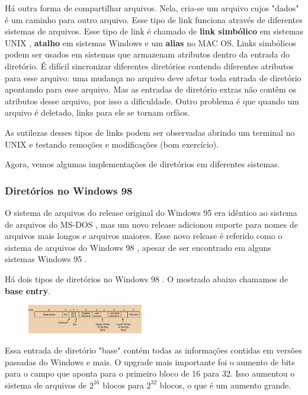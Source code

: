 \documentclass{article}
\newcommand\unix{{\color{red}UNIX} }
\newcommand\msdos{{\color{yellow}MS-DOS} }
\newcommand\winnoveoito{{\color{pink}Windows 98} }
\newcommand\winnovecinco{{\color{green}Windows 95} }
\begin{document}
Há outra forma de compartilhar arquivos. Nela, cria-se um arquivo cujos "dados" é um caminho para outro arquivo. Esse tipo de link funciona através de diferentes sistemas de arquivos. Esse tipo de link é chamado de \textbf{link simbólico} em sistemas \unix, \textbf{atalho} em sistemas Windows e um \textbf{alias} no MAC OS. Links simbólicos podem ser usados em sistemas que armazenam atributos dentro da entrada do diretório. É difícil sincronizar diferentes diretórios contendo diferentes atributos para esse arquivo: uma mudança no arquivo deve afetar toda entrada de diretório apontando para esse arquivo. Mas as entradas de diretório extras não contêm os atributos desse arquivo, por isso a dificuldade. Outro problema é que quando um arquivo é deletado, links para ele se tornam orfãos.

As sutilezas desses tipos de links podem ser observadas abrindo um terminal no UNIX e testando remoções e modificações (bom exercício).

Agora, vemos algumas implementações de diretórios em diferentes sistemas.

\subsubsection{Diretórios no \winnoveoito}

O sistema de arquivos do release original do \winnovecinco era idêntico ao sistema de arquivos do \msdos, mas um novo release adicionou suporte para nomes de arquivos mais longos e arquivos maiores. Esse novo release é referido como o sistema de arquivos do \winnoveoito, apesar de ser encontrado em alguns sistemas \winnovecinco.

Há dois tipos de diretórios no \winnoveoito. O mostrado abaixo chamamos de \textbf{base entry}.

\begin{figure}[h]
  \begin{center}
    \includegraphics[width=0.45\textwidth]{img/5-13.png}
  \end{center}
  \caption{}
  \label{fig:}
\end{figure}

Essa entrada de diretório "base" contém todas as informações contidas em versões passadas do Windows e mais. O upgrade mais importante foi o aumento de bits para o campo que aponta para o primeiro bloco de 16 para 32. Isso aumentou o sistema de arquivos de $2^{16}$ blocos para $2^{32}$ blocos, o que é um aumento grande.
\end{document}
